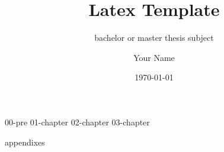 \documentclass[
	final %
	,12pt %
	,a4paper %
	,oneside %
	,BCOR=12mm %
	,headings=normal %
	,toc=graduated %
	,bibliography=totoc %
]{scrreprt} %
\author{Your Name}
\title{Latex Template}
\subtitle{bachelor or master thesis subject}
\date{\today}
\begin{document}
{00-pre}
{01-chapter}
{02-chapter}
{03-chapter}
\newpage

{appendixes}
\end{document}
